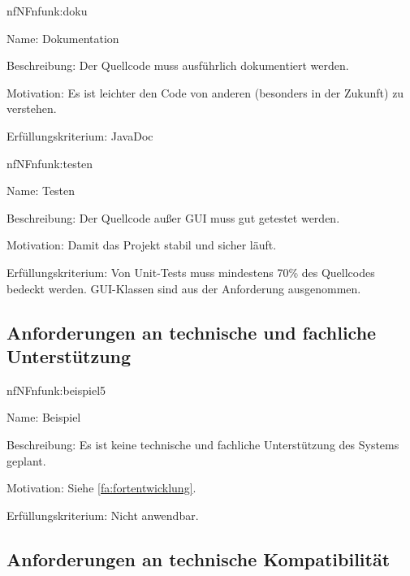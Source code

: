 \begin{description}[leftmargin=5em, style=sameline]	
	\begin{lhp}{nf}{NF}{nfunk:doku}
		\item [Name:] Dokumentation
		\item [Beschreibung:] Der Quellcode muss ausführlich dokumentiert werden.
		\item [Motivation:] Es ist leichter den Code von anderen (besonders in der Zukunft) zu verstehen.
		\item [Erfüllungskriterium:] JavaDoc 
	\end{lhp}
\end{description}

\begin{description}[leftmargin=5em, style=sameline]	
	\begin{lhp}{nf}{NF}{nfunk:testen}
		\item [Name:] Testen
		\item [Beschreibung:] Der Quellcode außer GUI muss gut getestet werden.
		\item [Motivation:] Damit das Projekt stabil und sicher läuft.
		\item [Erfüllungskriterium:] Von Unit-Tests muss mindestens 70\% des Quellcodes bedeckt werden. GUI-Klassen sind aus der Anforderung ausgenommen.
	\end{lhp}
\end{description}

\subsection{Anforderungen an technische und fachliche Unterstützung}

\begin{description}[leftmargin=5em, style=sameline]	
	\begin{lhp}{nf}{NF}{nfunk:beispiel5}
		\item [Name:] Beispiel
		\item [Beschreibung:] Es ist keine technische und fachliche Unterstützung des Systems geplant.
		\item [Motivation:] Siehe \ref{fa:fortentwicklung}.
		\item [Erfüllungskriterium:] Nicht anwendbar.
	\end{lhp}
\end{description}

\subsection{Anforderungen an technische Kompatibilität}

